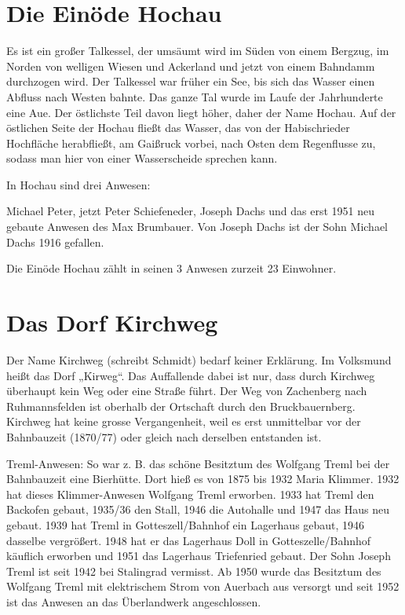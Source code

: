 \documentclass[12pt,a4pager]{book}
\begin{document}
\section{Die Einöde Hochau}

Es ist ein großer Talkessel, der umsäumt wird im Süden von einem Bergzug, im
Norden von welligen Wiesen und Ackerland und jetzt von einem Bahndamm durchzogen
wird. Der Talkessel war früher ein See, bis sich das Wasser einen Abfluss nach
Westen bahnte. Das ganze Tal wurde im Laufe der Jahrhunderte eine Aue. Der
östlichste Teil davon liegt höher, daher der Name Hochau. Auf der östlichen
Seite der Hochau fließt das Wasser, das von der Habischrieder Hochfläche
herabfließt, am Gaißruck vorbei, nach Osten dem Regenflusse zu, sodass man hier
von einer Wasserscheide sprechen kann.

In Hochau sind drei Anwesen:

Michael Peter, jetzt Peter Schiefeneder, Joseph Dachs und das erst 1951 neu
gebaute Anwesen des Max Brumbauer. Von Joseph Dachs ist der Sohn Michael Dachs
1916 gefallen.

Die Einöde Hochau zählt in seinen 3 Anwesen zurzeit 23 Einwohner.

\section{Das Dorf Kirchweg}

Der Name Kirchweg (schreibt Schmidt) bedarf keiner Erklärung. Im Volksmund heißt
das Dorf „Kirweg“. Das Auffallende dabei ist nur, dass durch Kirchweg überhaupt
kein Weg oder eine Straße führt. Der Weg von Zachenberg nach Ruhmannsfelden ist
oberhalb der Ortschaft durch den Bruckbauernberg. Kirchweg hat keine grosse
Vergangenheit, weil es erst unmittelbar vor der Bahnbauzeit (1870/77) oder
gleich nach derselben entstanden ist.

Treml-Anwesen: So war z. B. das schöne Besitztum des Wolfgang Treml bei der
Bahnbauzeit eine Bierhütte. Dort hieß es von 1875 bis 1932 Maria Klimmer. 1932
hat dieses Klimmer-Anwesen Wolfgang Treml erworben. 1933 hat Treml den Backofen
gebaut, 1935/36 den Stall, 1946 die Autohalle und 1947 das Haus neu gebaut. 1939
hat Treml in Gotteszell/Bahnhof ein Lagerhaus gebaut, 1946 dasselbe vergrößert.
1948 hat er das Lagerhaus Doll in Gotteszelle/Bahnhof käuflich erworben und 1951
das Lagerhaus Triefenried gebaut. Der Sohn Joseph Treml ist seit 1942 bei
Stalingrad vermisst. Ab 1950 wurde das Besitztum des Wolfgang Treml mit
elektrischem Strom von Auerbach aus versorgt und seit 1952 ist das Anwesen an
das Überlandwerk angeschlossen.
\end{document}
